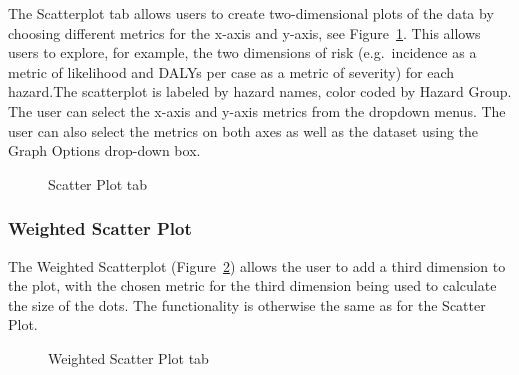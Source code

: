 \documentclass[
  letterpaper,
  DIV=11,
  numbers=noendperiod]{scrartcl}
\begin{document}
The Scatterplot tab allows users to create two-dimensional plots of the
data by choosing different metrics for the x-axis and y-axis, see
Figure~\ref{fig-scatter}. This allows users to explore, for example, the
two dimensions of risk (e.g.~incidence as a metric of likelihood and
DALYs per case as a metric of severity) for each hazard.The scatterplot
is labeled by hazard names, color coded by Hazard Group. The user can
select the x-axis and y-axis metrics from the dropdown menus. The user
can also select the metrics on both axes as well as the dataset using
the Graph Options drop-down box.

\begin{figure}


\caption{\label{fig-scatter}Scatter Plot tab}

\end{figure}%

\subsubsection{Weighted Scatter Plot}\label{weighted-scatter-plot}

The Weighted Scatterplot (Figure~\ref{fig-w-scatter}) allows the user to
add a third dimension to the plot, with the chosen metric for the third
dimension being used to calculate the size of the dots. The
functionality is otherwise the same as for the Scatter Plot.

\begin{figure}


\caption{\label{fig-w-scatter}Weighted Scatter Plot tab}

\end{figure}%
\end{document}
